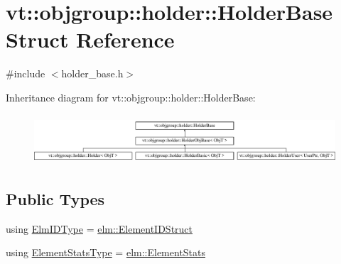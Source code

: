 \hypertarget{structvt_1_1objgroup_1_1holder_1_1_holder_base}{}\section{vt\+:\+:objgroup\+:\+:holder\+:\+:Holder\+Base Struct Reference}
\label{structvt_1_1objgroup_1_1holder_1_1_holder_base}


{\ttfamily \#include $<$holder\+\_\+base.\+h$>$}

Inheritance diagram for vt\+:\+:objgroup\+:\+:holder\+:\+:Holder\+Base\+:\begin{figure}[H]
\begin{center}
\leavevmode
\includegraphics[height=1.866667cm]{structvt_1_1objgroup_1_1holder_1_1_holder_base}
\end{center}
\end{figure}
\subsection*{Public Types}
\begin{DoxyCompactItemize}
\item 
using \hyperlink{structvt_1_1objgroup_1_1holder_1_1_holder_base_a89c0ce1f23237ab00aee86d4d339bc50}{Elm\+I\+D\+Type} = \hyperlink{structvt_1_1elm_1_1_element_i_d_struct}{elm\+::\+Element\+I\+D\+Struct}
\item 
using \hyperlink{structvt_1_1objgroup_1_1holder_1_1_holder_base_a2c1e7b13a85838aa6f4385266a20e7d5}{Element\+Stats\+Type} = \hyperlink{structvt_1_1elm_1_1_element_stats}{elm\+::\+Element\+Stats}
\end{DoxyCompactItemize}
